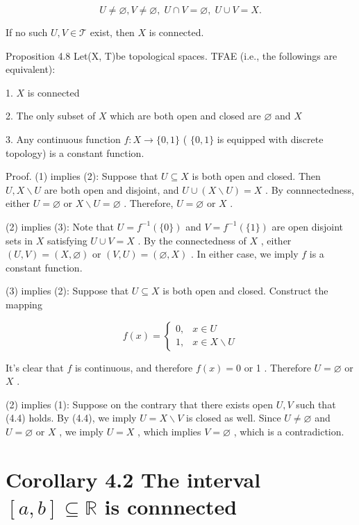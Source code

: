 \[
U \neq  \varnothing ,V \neq  \varnothing ,\;U \cap  V = \varnothing ,\;U \cup  V = X. \tag{4.4}
\]

If no such \(U,V \in  \mathcal{T}\) exist, then \(X\) is connected.

Proposition 4.8 Let(X, T)be topological spaces. TFAE (i.e., the followings are equivalent):

1. \(X\) is connected

2. The only subset of \(X\) which are both open and closed are \(\varnothing\) and \(X\)

3. Any continuous function \(f : X \rightarrow  \{ 0,1\}\) ( \(\{ 0,1\}\) is equipped with discrete topology) is a constant function.

Proof. (1) implies (2): Suppose that \(U \subseteq  X\) is both open and closed. Then \(U,X \smallsetminus  U\) are both open and disjoint, and \(U \cup  \left( {X \smallsetminus  U}\right)  = X\) . By connnectedness, either \(U = \varnothing\) or \(X \smallsetminus  U = \varnothing\) . Therefore, \(U = \varnothing\) or \(X\) .

(2) implies (3): Note that \(U = {f}^{-1}\left( {\{ 0\} }\right)\) and \(V = {f}^{-1}\left( {\{ 1\} }\right)\) are open disjoint sets in \(X\) satisfying \(U \cup  V = X\) . By the connectedness of \(X\) , either \(\left( {U,V}\right)  = \left( {X,\varnothing }\right)\) or \(\left( {V,U}\right)  = \left( {\varnothing ,X}\right)\) . In either case, we imply \(f\) is a constant function.

(3) implies (2): Suppose that \(U \subseteq  X\) is both open and closed. Construct the mapping

\[
f\left( x\right)  = \left\{  \begin{array}{ll} 0, & x \in  U \\  1, & x \in  X \smallsetminus  U \end{array}\right.
\]

It’s clear that \(f\) is continuous, and therefore \(f\left( x\right)  = 0\) or 1 . Therefore \(U = \varnothing\) or \(X\) .

(2) implies (1): Suppose on the contrary that there exists open \(U,V\) such that (4.4) holds. By (4.4), we imply \(U = X \smallsetminus  V\) is closed as well. Since \(U \neq  \varnothing\) and \(U = \varnothing\) or \(X\) , we imply \(U = X\) , which implies \(V = \varnothing\) , which is a contradiction.

\section*{Corollary 4.2 The interval \(\left\lbrack  {a,b}\right\rbrack   \subseteq  \mathbb{R}\) is connnected}


